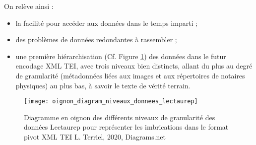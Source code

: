 On relève ainsi : 
\begin{itemize}
    \item la facilité pour accéder aux données dans le temps imparti ;
    \item des problèmes de données redondantes à rassembler ;
    \item une première hiérarchisation (Cf. Figure \ref{fig:oignon_diagram_niveaux_donnees_lectaurep}) des données dans le futur encodage XML TEI, avec trois niveaux bien distincts, allant du plus au degré de granularité (métadonnées liées aux images et aux répertoires de notaires physiques) au plus bas, à savoir le texte de vérité terrain.
\end{itemize}
\begin{figure}
    \centering
    \centerline{\texttt{[image: oignon\_diagram\_niveaux\_donnees\_lectaurep]}}
    \caption{Diagramme en oignon des différents niveaux de granularité des données Lectaurep pour représenter les imbrications dans le format pivot XML TEI \textcopyright L. Terriel, 2020, Diagrams.net}
    \label{fig:oignon_diagram_niveaux_donnees_lectaurep}
\end{figure}
\newpage
